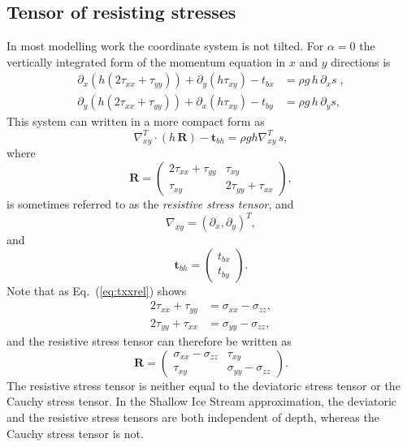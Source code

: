 \documentclass[10pt,a4paper]{book}
\newcommand{\p}{\partial}
\newcommand{\txx}{\tau_{xx}}
\newcommand{\tyy}{\tau_{yy}}
\newcommand{\txy}{\tau_{xy}}
\newcommand{\sxx}{\sigma_{xx}}
\newcommand{\syy}{\sigma_{yy}}
\newcommand{\szz}{\sigma_{zz}}
\begin{document}
\subsection{Tensor of resisting stresses}
In most modelling work the coordinate system is not tilted. For
$\alpha=0$ the vertically integrated form of the momentum equation in
$x$ and $y$ directions is
\begin{align}
\p_x (h (2\txx+\tyy)) + \p_y(h\txy)-t_{bx} &= \rho g \,h \, \p_x s   \;  ,\\
\p_y (h (2\txx+\tyy)) + \p_x(h\txy)-t_{by} &= \rho g \,h \, \p_y s    ,
\end{align}
This system can written in a more compact form as
\begin{equation}
\nabla_{xy}^T \cdot (h \, \bm{R}) - \bm{t}_{bh} = \rho g h \nabla_{xy}^T \, s  
,
\label{eq:FEao}
\end{equation}
where
\begin{equation}
\bm{R}=\begin{pmatrix} 2 \txx+\tyy & \txy \\ \txy & 2 \tyy + \txx \end{pmatrix},
\label{eq:defSigmah}
\end{equation}
is sometimes referred to as the {\em resistive stress tensor}, and
\[
\nabla_{xy} = (\p_x , \p_y)^T ,
\]
and
\[
\bm{t}_{bh}= \left ( \begin{array}{c} t_{bx} \\ t_{by} \end{array} \right ).
\]
Note that as Eq.~(\ref{eq:txxrel}) shows
\begin{align}
2 \txx + \tyy &=  \sxx - \szz ,\\
2 \tyy + \txx &=  \syy - \szz ,
\end{align}
and the resistive stress tensor can therefore be written as 
\begin{equation}
\bm{R}=\begin{pmatrix} \sxx-\szz & \txy \\ \txy & \syy - \szz \end{pmatrix}.
\label{eq:defSigmah2}
\end{equation}
The resistive stress tensor is neither equal to the deviatoric stress
tensor or the Cauchy stress tensor. In the Shallow Ice Stream
approximation, the deviatoric and the resistive stress tensors are both
independent of depth, whereas the Cauchy stress tensor is not.
\end{document}
